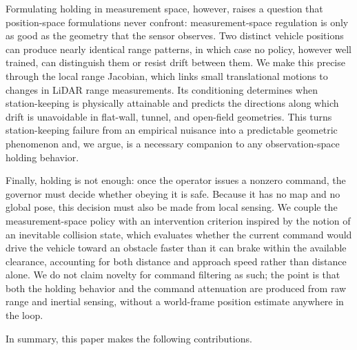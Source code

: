 \documentclass[11pt]{article}
\begin{document}
Formulating holding in measurement space, however, raises a question that
position-space formulations never confront: measurement-space regulation is
only as good as the geometry that the sensor observes. Two distinct vehicle
positions can produce nearly identical range patterns, in which case no policy,
however well trained, can distinguish them or resist drift between them. We
make this precise through the local range Jacobian, which links small
translational motions to changes in LiDAR range measurements. Its conditioning
determines when station-keeping is physically attainable and predicts the
directions along which drift is unavoidable in flat-wall, tunnel, and
open-field geometries. This turns station-keeping failure from an empirical
nuisance into a predictable geometric phenomenon and, we argue, is a necessary
companion to any observation-space holding behavior.

Finally, holding is not enough: once the operator issues a nonzero command,
the governor must decide whether obeying it is safe. Because it has no map and
no global pose, this decision must also be made from local sensing. We couple
the measurement-space policy with an intervention criterion inspired by the
notion of an inevitable collision state, which evaluates whether the current
command would drive the vehicle toward an obstacle faster than it can brake
within the available clearance, accounting for both distance and approach
speed rather than distance alone. We do not claim novelty for command
filtering as such; the point is that both the holding behavior and the command
attenuation are produced from raw range and inertial sensing, without a
world-frame position estimate anywhere in the loop.

In summary, this paper makes the following contributions.
\end{document}
